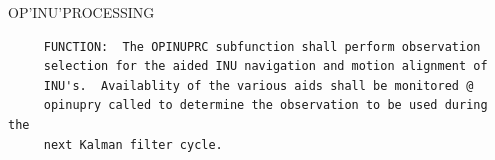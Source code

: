 \begin{frame}
OP'INU'PROCESSING
\begin{verbatim}
     FUNCTION:  The OPINUPRC subfunction shall perform observation
     selection for the aided INU navigation and motion alignment of
     INU's.  Availablity of the various aids shall be monitored @
     opinupry called to determine the observation to be used during the
     next Kalman filter cycle.

\end{verbatim}
\end{frame}
